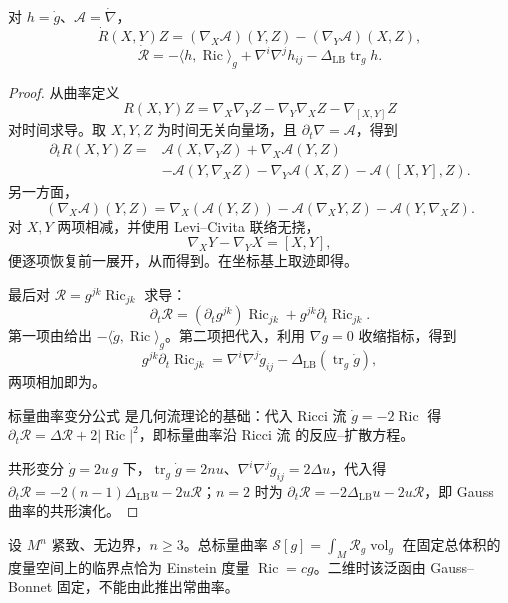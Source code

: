 \begin{proposition}[曲率与标量曲率的变分]
对 $h=\dot g$、$\mathcal A=\dot\nabla$，\[\dot R(X,Y)Z=(\nabla_X\mathcal A)(Y,Z)-(\nabla_Y\mathcal A)(X,Z),\]\[\dot{\mathcal R}=-\langle h,\operatorname{Ric}\rangle_g+\nabla^i\nabla^jh_{ij}-\Delta_{\mathrm{LB}}\operatorname{tr}_gh.\]
\end{proposition}

\begin{proof}
从曲率定义
\[
R(X,Y)Z
=\nabla_X\nabla_YZ-\nabla_Y\nabla_XZ-\nabla_{[X,Y]}Z
\]
对时间求导。取 $X,Y,Z$ 为时间无关向量场，且 $\partial_t\nabla=\mathcal A$，得到
\[
\begin{aligned}
\partial_tR(X,Y)Z
={}&\mathcal A(X,\nabla_YZ)+\nabla_X\mathcal A(Y,Z)\\
&-\mathcal A(Y,\nabla_XZ)-\nabla_Y\mathcal A(X,Z)
-\mathcal A([X,Y],Z).
\end{aligned}
\]
另一方面，
\[
(\nabla_X\mathcal A)(Y,Z)
=\nabla_X(\mathcal A(Y,Z))
-\mathcal A(\nabla_XY,Z)
-\mathcal A(Y,\nabla_XZ).
\]
对 $X,Y$ 两项相减，并使用 Levi--Civita 联络无挠，
\[
\nabla_XY-\nabla_YX=[X,Y],
\]
便逐项恢复前一展开，从而得到。在坐标基上取迹即得。

最后对 $\mathcal R=g^{jk}\operatorname{Ric}_{jk}$ 求导：
\[
\partial_t\mathcal R
=(\partial_tg^{jk})\operatorname{Ric}_{jk}
+g^{jk}\partial_t\operatorname{Ric}_{jk}.
\]
第一项由给出
$-\langle\dot g,\operatorname{Ric}\rangle_g$。第二项把代入，利用 $\nabla g=0$ 收缩指标，得到
\[
g^{jk}\partial_t\operatorname{Ric}_{jk}
=\nabla^i\nabla^j\dot g_{ij}
-\Delta_{\mathrm{LB}}(\operatorname{tr}_g\dot g),
\]
两项相加即为。

标量曲率变分公式 是几何流理论的基础：代入 Ricci 流 $\dot g=-2\operatorname{Ric}$ 得 $\partial_t\mathcal R=\Delta\mathcal R+2|\operatorname{Ric}|^2$，即标量曲率沿 Ricci 流 的反应--扩散方程。

共形变分 $\dot g=2u\,g$ 下，$\operatorname{tr}_g\dot g=2nu$、$\nabla^i\nabla^j\dot g_{ij}=2\Delta u$，代入得 $\partial_t\mathcal R=-2(n-1)\Delta_{\mathrm{LB}}u-2u\mathcal R$；$n=2$ 时为 $\partial_t\mathcal R=-2\Delta_{\mathrm{LB}}u-2u\mathcal R$，即 Gauss 曲率的共形演化。
\end{proof}

\begin{theorem}[固定体积的总标量曲率临界点]
设 $M^n$ 紧致、无边界，$n\ge3$。总标量曲率 $\mathcal S[g]=\int_M\mathcal R_g\operatorname{vol}_g$ 在固定总体积的度量空间上的临界点恰为 Einstein 度量 $\operatorname{Ric}=cg$。二维时该泛函由 Gauss--Bonnet 固定，不能由此推出常曲率。
\end{theorem}

